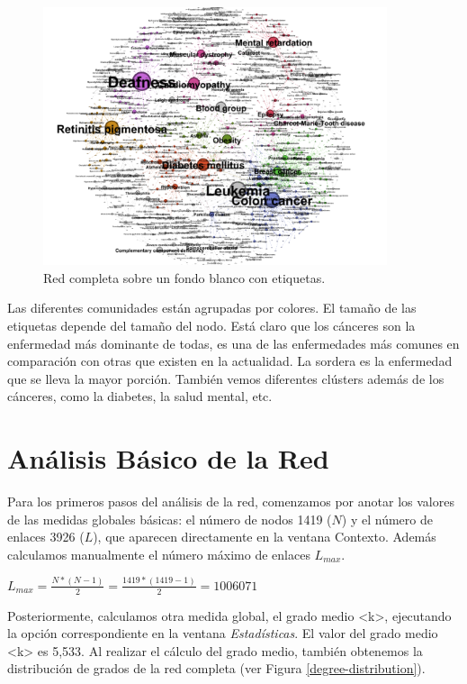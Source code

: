 \documentclass{uimppracticas}
\begin{document}
\begin{figure}[H]
	\centering
	\includegraphics[width=0.9\textwidth]{images/completa_FR_labels}
	\caption{Red completa sobre un fondo blanco con etiquetas.}
	\label{completa_FR_labels}
\end{figure}

Las diferentes comunidades están agrupadas por colores. El tamaño de las etiquetas depende del tamaño del nodo. Está claro que los cánceres son la enfermedad más dominante de todas, es una de las enfermedades más comunes en comparación con otras que existen en la actualidad. La sordera es la enfermedad que se lleva la mayor porción. También vemos diferentes clústers además de los cánceres, como la diabetes, la salud mental, etc. 

\newpage

\section*{Análisis Básico de la Red}

Para los primeros pasos del análisis de la red, comenzamos por anotar los valores de las medidas globales básicas: el número de nodos 1419 ($N$) y el número de enlaces 3926 ($L$), que aparecen directamente en la ventana Contexto. Además calculamos manualmente el número máximo de enlaces $L_{max}$. 

\begin{center}
	$L_{max} = \frac{N * (N-1)}{2} = \frac{1419 * (1419-1)}{2} = 1006071$
\end{center}

Posteriormente, calculamos otra medida global, el grado medio <k>, ejecutando la opción correspondiente en la ventana \textit{Estadísticas}. El valor del grado medio <k> es 5,533. Al realizar el cálculo del grado medio, también obtenemos la distribución de grados de la red completa (ver Figura \ref{degree-distribution}).
\end{document}
